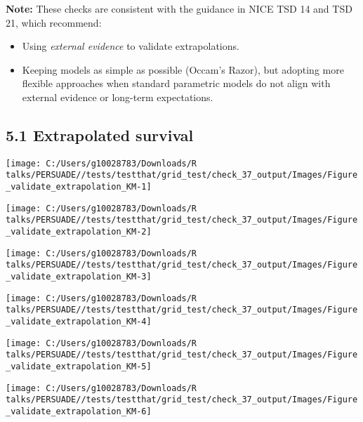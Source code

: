\documentclass[
]{article}
\providecommand{\tightlist}{%
  \setlength{\itemsep}{0pt}\setlength{\parskip}{0pt}}
\begin{document}
\textbf{Note:} These checks are consistent with the guidance in NICE TSD
14 and TSD 21, which recommend:

\begin{itemize}
\tightlist
\item
  Using \emph{external evidence} to validate extrapolations.\\
\item
  Keeping models as simple as possible (Occam's Razor), but adopting
  more flexible approaches when standard parametric models do not align
  with external evidence or long-term expectations.
\end{itemize}

\subsection{5.1 Extrapolated survival}\label{extrapolated-survival}

\begin{flushleft}\texttt{[image: C:/Users/g10028783/Downloads/R talks/PERSUADE//tests/testthat/grid\_test/check\_37\_output/Images/Figure\_validate\_extrapolation\_KM-1]} \end{flushleft}

\begin{flushleft}\texttt{[image: C:/Users/g10028783/Downloads/R talks/PERSUADE//tests/testthat/grid\_test/check\_37\_output/Images/Figure\_validate\_extrapolation\_KM-2]} \end{flushleft}

\begin{flushleft}\texttt{[image: C:/Users/g10028783/Downloads/R talks/PERSUADE//tests/testthat/grid\_test/check\_37\_output/Images/Figure\_validate\_extrapolation\_KM-3]} \end{flushleft}

\begin{flushleft}\texttt{[image: C:/Users/g10028783/Downloads/R talks/PERSUADE//tests/testthat/grid\_test/check\_37\_output/Images/Figure\_validate\_extrapolation\_KM-4]} \end{flushleft}

\begin{flushleft}\texttt{[image: C:/Users/g10028783/Downloads/R talks/PERSUADE//tests/testthat/grid\_test/check\_37\_output/Images/Figure\_validate\_extrapolation\_KM-5]} \end{flushleft}

\begin{flushleft}\texttt{[image: C:/Users/g10028783/Downloads/R talks/PERSUADE//tests/testthat/grid\_test/check\_37\_output/Images/Figure\_validate\_extrapolation\_KM-6]} \end{flushleft}
\end{document}
